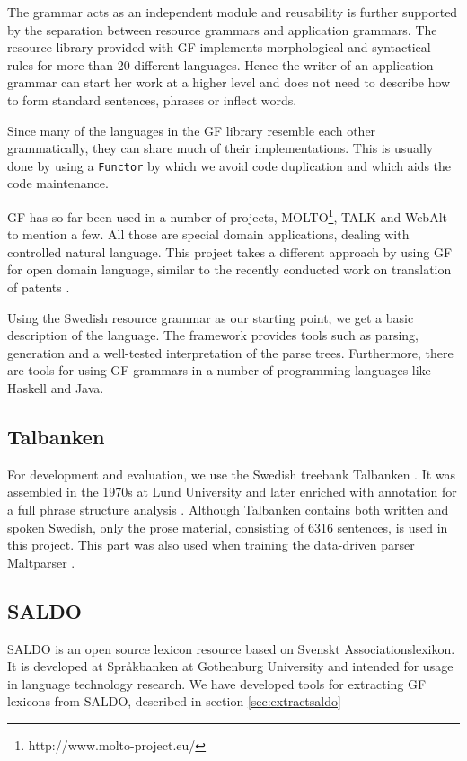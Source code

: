 \documentclass[10pt, a4paper]{article}
\begin{document}
The grammar acts as an independent module and reusability is further supported
by the separation between resource grammars and application grammars. The
resource library provided with GF implements morphological and syntactical
rules for more than 20 different languages.  Hence the writer of an application
grammar can start her work at a higher level and does not need to describe how
to form standard sentences, phrases or inflect words.

Since many of the languages in the GF library resemble each other grammatically,
they can share much of their implementations. This is usually done by using a
\verb|Functor| by which we avoid code duplication and which aids the code maintenance.

GF has so far been used in a number of projects,
MOLTO\footnote{http://www.molto-project.eu/}, TALK \cite{talk}
and WebAlt \cite{webalt} to mention a few. 
All those are special domain applications, dealing with controlled natural
language.
This project takes a different approach by using GF for open domain language,
similar to the recently conducted work on translation of patents \cite{patent}.

Using the Swedish resource grammar as our starting
point, we get a basic description of the language. The framework provides
tools such as parsing, generation and
a well-tested interpretation of the parse trees. Furthermore, there are tools
for using GF grammars in a number of programming languages like Haskell
and Java. 



\subsection{Talbanken}
For development and evaluation, we use the Swedish treebank
Talbanken \cite{talbanken}.
It was assembled in the 1970s at Lund University and later
enriched with annotation for a full phrase structure analysis \cite{talbanken05}.  
Although Talbanken contains both written and spoken Swedish,
only the prose material, consisting of 6316 sentences, is used in this
project.
This part was also used when training the data-driven parser Maltparser \cite{malt}. \\

\subsection{SALDO}
SALDO \cite{saldo} is an open source lexicon resource
based on Svenskt Associationslexikon. It is
developed at Spr{\aa}kbanken at Gothenburg University
and intended for usage in language technology
research. 
We have developed tools for extracting GF lexicons
from SALDO, described in section \ref{sec:extractsaldo}
\end{document}

